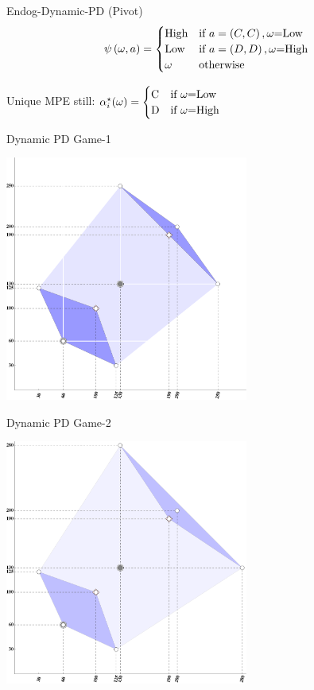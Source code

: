 \documentclass{beamer}
\begin{document}
\begin{frame}{Endog-Dynamic-PD (Pivot)}
\textrm{
\[
\psi\left(\mbox{\ensuremath{\omega}},a\right)=\begin{cases}
\mbox{High} & \mbox{if }a=\left(C,C\right),\mbox{\ensuremath{\omega}=Low}\\
\mbox{Low} & \mbox{if }a=\left(D,D\right),\mbox{\ensuremath{\omega}=High}\\
\omega & \mbox{otherwise}
\end{cases}
\]
\pause}


Unique MPE still: $\alpha_{i}^{\star}(\omega)=\begin{cases}
\mbox{C} & \mbox{if \ensuremath{\omega}=Low}\\
\mbox{D} & \mbox{if \ensuremath{\omega}=High}
\end{cases}$

\end{frame}

\begin{frame}{Dynamic PD Game-1}
\begin{card}
    \begin{center}
    	\includegraphics[width=0.6\textwidth]{./i/col_GamePayoffs1.pdf}
    \end{center}
\end{card}
\end{frame}
\begin{frame}{Dynamic PD Game-2}
\begin{card}
    \begin{center}
    	\includegraphics[width=0.6\textwidth]{./i/col_GamePayoffs2.pdf}
    \end{center}
\end{card}
\end{frame}
\end{document}
